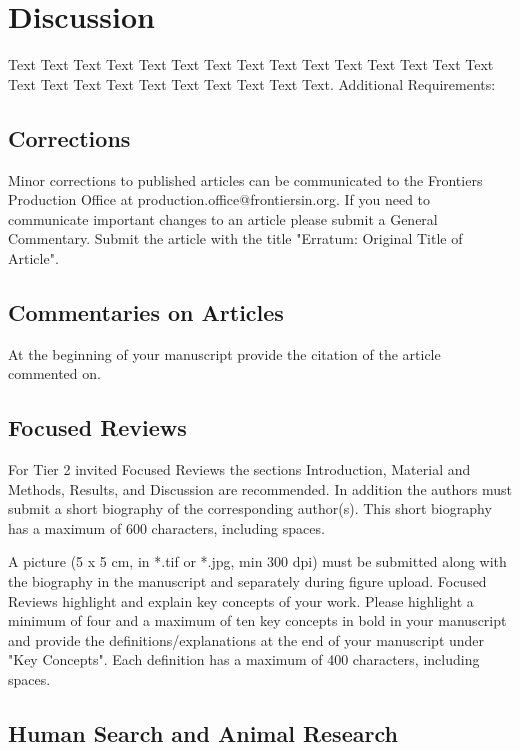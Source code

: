 \documentclass{frontiersENG} %
\begin{document}
\section{Discussion}

Text Text Text Text Text Text  Text Text Text Text Text Text Text Text Text  Text Text Text Text Text Text Text Text Text Text.
Additional Requirements:
\subsection{Corrections}

Minor corrections to published articles can be communicated to the Frontiers Production Office at production.office@frontiersin.org. If you need to communicate important changes to an article please submit a General Commentary. Submit the article with the title "Erratum: Original Title of Article".

\subsection{Commentaries on Articles}

At the beginning of your manuscript provide the citation of the article commented on.

\subsection{Focused Reviews}

For Tier 2 invited Focused Reviews the sections Introduction, Material and Methods, Results, and Discussion are recommended. In addition the authors must submit a short biography of the corresponding author(s). This short biography has a maximum of 600 characters, including spaces.

A picture (5 x 5 cm, in *.tif or *.jpg, min 300 dpi) must be submitted along with the biography in the manuscript and separately during figure upload.
Focused Reviews highlight and explain key concepts of your work. Please highlight a minimum of four and a maximum of ten key concepts in bold in your manuscript and provide the definitions/explanations at the end of your manuscript under "Key Concepts". Each definition has a maximum of 400 characters, including spaces.

\subsection{Human Search and Animal Research}
\end{document}
